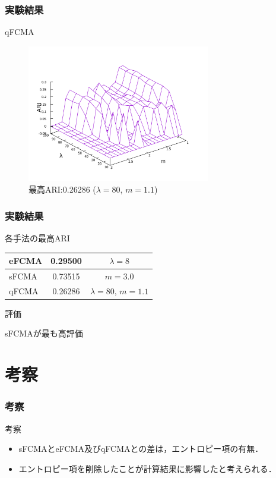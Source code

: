 \documentclass[13pt,dvipdfmx]{beamer}
\begin{document}
\begin{frame}\frametitle{実験結果}
  \begin{block}{qFCMA}
    \begin{figure}[htbp]
      \begin{center}
        \includegraphics[height=60mm]{qFCMA_ARI.pdf}
      \end{center}
      \captionsetup{labelformat=empty,labelsep=none}
      \caption{最高ARI:0.26286 ($\lambda=80$, $m=1.1$)}
    \end{figure}
  \end{block}
\end{frame}

\begin{frame}\frametitle{実験結果}
  \begin{block}{各手法の最高ARI}
    \vspace{5mm}
    \begin{table}
      \begin{tabular}{ l || c | c }\hline
       eFCMA & 0.29500 & $\lambda = 8$\\ \hline  
       sFCMA & 0.73515 & $m = 3.0$\\ \hline
       qFCMA & 0.26286 & $\lambda = 80 $\;, \;$m = 1.1$\\  \hline
      \end{tabular}
    \end{table}
  \end{block}
  \begin{block}{評価}
    \begin{center}
      sFCMAが最も高評価
    \end{center}
  \end{block}
\end{frame}

\section{考察}
\begin{frame}\frametitle{考察}
  \begin{block}{考察}
    \begin{itemize}
    \item sFCMAとeFCMA及びqFCMAとの差は，エントロピー項の有無．
    \item エントロピー項を削除したことが計算結果に影響したと考えられる．
    \end{itemize}
  \end{block}
\end{frame}
\end{document}
